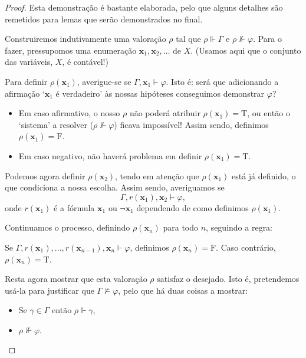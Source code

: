 \documentclass{report}
\theoremstyle{definition}
\theoremstyle{remark}
\renewcommand{\bf}[1]{\mathbf{#1}}
\newcommand{\lt}{\mathrm{T}}
\newcommand{\lf}{\mathrm{F}}
\begin{document}
	\begin{proof}
	Esta demonstração é bastante elaborada, pelo que alguns detalhes são remetidos para lemas que serão demonstrados no final.
	
	Construiremos indutivamente uma valoração $\rho$ tal que $\rho \Vdash \Gamma$ e $\rho \nVdash \varphi$. Para o fazer, pressupomos uma enumeração $\bf x_1, \bf x_2, \dots$ de $X$. (Usamos aqui que o conjunto das variáveis, $X$, é contável!)
	
	Para definir $\rho(\bf x_1)$, averigue-se se $\Gamma, \bf x_1 \vdash \varphi$. Isto é: será que adicionando a afirmação `$\bf x_1$ é verdadeiro' às nossas hipóteses conseguimos demonstrar $\varphi$?
	
	\begin{itemize}
	\item Em caso afirmativo, o nosso $\rho$ não poderá atribuir $\rho(\bf x_1) = \lt$, ou então o `sistema' a resolver ($\rho \nVdash \varphi$) ficava impossível! Assim sendo, definimos $\rho(\bf x_1) = \lf$. 
	
	\item Em caso negativo, não haverá problema em definir $\rho(\bf x_1) = \lt$.
	\end{itemize}
	
	Podemos agora definir $\rho(\bf x_2)$, tendo em atenção que $\rho(\bf x_1)$ está já definido, o que condiciona a nossa escolha. Assim sendo, averiguamos se
	\[\Gamma, r(\bf x_1), \bf x_2 \vdash \varphi,\]
	onde $r(\bf x_1)$ é a fórmula $\bf x_1$ ou $\neg \bf x_1$ dependendo de como definimos $\rho(\bf x_1)$.
	
	Continuamos o processo, definindo $\rho(\bf x_n)$ para todo $n$, seguindo a regra:

	\begin{center}
	Se $\Gamma, r(\bf x_1), \dots, r(\bf x_{n-1}), \bf x_n \vdash \varphi$, definimos $\rho(\bf x_n) = \lf$. Caso contrário, $\rho(\bf x_n) = \lt$.
	\end{center}
	
	Resta agora mostrar que esta valoração $\rho$ satisfaz o desejado. Isto é, pretendemos usá-la para justificar que $\Gamma \nvDash \varphi$, pelo que há duas coisas a mostrar:
	
	\begin{itemize}
	\item Se $\gamma \in \Gamma$ então $\rho \Vdash \gamma$,
	
	\item $\rho \nVdash \varphi$.
	\end{itemize}
	

\end{proof}
\end{document}
